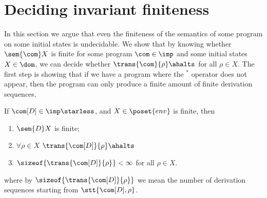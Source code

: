 \section{Deciding invariant finiteness}\label{sec:finiteness}

In this section we argue that even the finiteness of the semantics of
some program on some initial states is undecidable. We show that by
knowing whether \(\sem{\com}X\) is finite for some program
\(\com\in\imp\) and some initial states \(X\in \dom\), we can decide
whether \(\trans{\com}{\rho}\ahalts\) for all \(\rho \in X\). The
first step is showing that if we have a program where the \(^*\)
operator does not appear, then the program can only produce a finite
amount of finite derivation sequences.

\begin{lemma}\label{le:finiteness}
  If \(\com[D]\in\imp\starless\), and \(X \in \poset{env}\) is
  finite, then
  \begin{enumerate}[label=(\roman*).]
  \item \(\sem{D}X\) is finite;
  \item \(\forall \rho \in X\) \(\trans{\com[D]}{\rho}\ahalts\)
  \item \(\sizeof{\trans{\com[D]}{\rho}} < \infty\) for all
    \(\rho \in X\).
  \end{enumerate}

  where by \(\sizeof{\trans{\com[D]}{\rho}}\) we mean the number of
  derivation sequences starting from \(\stt{\com[D], \rho}\).
\end{lemma}

